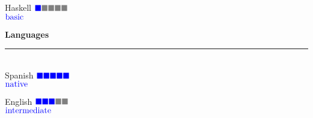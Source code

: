 \documentclass{article}
\begin{document}
\begin{minipage}{0.3\linewidth}
  \large Haskell \hfill $\color{blue} \blacksquare \color{gray} \blacksquare \color{gray} \blacksquare \color{gray} \blacksquare  \color{gray} \blacksquare$  \\[-0.8mm]
  \null\hfill \small{ $\color{blue} \textnormal{basic}$}

  \textbf{\Large{\color{BlueViolet}Languages}}\\[-0.25cm]
  {\color{BlueViolet} \rule{\linewidth}{0.1mm} }\\
  \large Spanish \hfill $\color{blue} \blacksquare\color{blue} \blacksquare \color{blue} \blacksquare \color{blue} \blacksquare  \color{blue} \blacksquare$  \\[-0.8mm]
  \null\hfill \small{ $\color{blue} \textnormal{native}$}

  \large English \hfill $\color{blue} \blacksquare\color{blue} \blacksquare \color{blue} \blacksquare \color{gray} \blacksquare  \color{gray} \blacksquare$  \\[-0.8mm]
  \null\hfill \small{ $\color{blue} \textnormal{intermediate}$}
  
\end{minipage}
\hspace{0.25cm}\vline\hspace{0.25cm}
\end{document}
